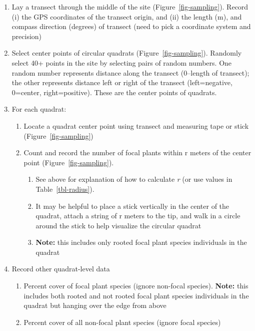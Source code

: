 \documentclass[
  letterpaper,
  oneside,
  open=any]{scrbook}
\begin{document}
\begin{enumerate}
\def\labelenumi{\arabic{enumi}.}
\item
  Lay a transect through the middle of the site
  (Figure~\ref{fig-sampling}). Record (i) the GPS coordinates of the
  transect origin, and (ii) the length (m), and compass direction
  (degrees) of transect (need to pick a coordinate system and precision)
\item
  Select center points of circular quadrats (Figure~\ref{fig-sampling}).
  Randomly select 40+ points in the site by selecting pairs of random
  numbers. One random number represents distance along the transect
  (0--length of transect); the other represents distance left or right
  of the transect (left=negative, 0=center, right=positive). These are
  the center points of quadrats.
\item
  For each quadrat:

  \begin{enumerate}
  \def\labelenumii{\alph{enumii}.}
  \item
    Locate a quadrat center point using transect and measuring tape or
    stick (Figure~\ref{fig-sampling})
  \item
    Count and record the number of focal plants within r meters of the
    center point (Figure~\ref{fig-sampling}).

    \begin{enumerate}
    \def\labelenumiii{\roman{enumiii}.}
    \item
      See above for explanation of how to calculate \emph{r} (or use
      values in Table~\ref{tbl-radius}).
    \item
      It may be helpful to place a stick vertically in the center of the
      quadrat, attach a string of r meters to the tip, and walk in a
      circle around the stick to help visualize the circular quadrat
    \item
      \textbf{Note:} this includes only rooted focal plant species
      individuals in the quadrat
    \end{enumerate}
  \end{enumerate}
\item
  Record other quadrat-level data

  \begin{enumerate}
  \def\labelenumii{\alph{enumii}.}
  \item
    Percent cover of focal plant species (ignore non-focal species).
    \textbf{Note:} this includes both rooted and not rooted focal plant
    species individuals in the quadrat but hanging over the edge from
    above
  \item
    Percent cover of all non-focal plant species (ignore focal species)


\end{enumerate}
\end{enumerate}
\end{document}
